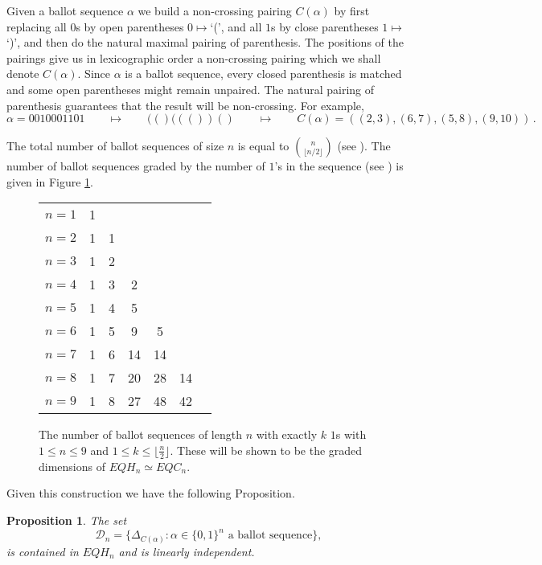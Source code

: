 \documentclass[11pt,oneside]{amsart}
\newtheorem{prop}[theorem]{Proposition}
\theoremstyle{definition}
\numberwithin{equation}{section}
\begin{document}
Given a ballot sequence $\alpha$ we build a non-crossing pairing $C(\alpha)$ by first replacing all $0$s
by open parentheses $0\mapsto$`(',
and all $1$s by close parentheses $1\mapsto$`)',
and then do the natural maximal pairing of parenthesis. The positions of the pairings
give us in lexicographic order a non-crossing pairing which we shall denote $C(\alpha)$.
Since $\alpha$ is a ballot sequence, every closed parenthesis is matched
and some open parentheses might remain unpaired.
The natural pairing of parenthesis guarantees that the result will be non-crossing. For example,
\[
\alpha=0010001101 \qquad\mapsto\qquad (()((())() \qquad\mapsto\qquad C(\alpha)=((2,3),(6,7),(5,8),(9,10)) \,.
\]

The total number of ballot sequences of size $n$ is equal to $\binom{n}{\lfloor{n/2}\rfloor}$
(see \cite[\href{https://oeis.org/A001405}{A001405}]{OEIS}).
The number of ballot sequences graded by the number of $1$'s in the sequence
(see \cite[\href{https://oeis.org/A008315}{A008315}]{OEIS})
is given in Figure \ref{table:ballotseq}.


\begin{figure}[h]
\begin{tabular}{c||cccccc}
$n=1$&1&&&&\\
$n=2$&1&1&&&\\
$n=3$&1&2&&&\\
$n=4$&1&3&2&&\\
$n=5$&1&4&5&&\\
$n=6$&1&5&9&5&\\
$n=7$&1&6&14&14&\\
$n=8$&1&7&20&28&14\\
$n=9$&1&8&27&48&42\\
\end{tabular}
\caption{The number of ballot sequences of length $n$ with exactly $k$ $1$s
with $1 \leq n \leq 9$ and $1 \leq k \leq \lfloor \frac{n}{2} \rfloor$.
These will be shown to be the graded dimensions of $EQH_n \simeq EQC_n$.}
\label{table:ballotseq}
\end{figure}

Given this construction we have the following Proposition.

\begin{prop}\label{prop:harmbasis}
The set
$${\mathcal D}_n =\big\{ \Delta_{C(\alpha)}:  \alpha \in \{0, 1\}^n \text{ a ballot sequence}\big\},
$$
is contained in $EQH_n$ and is linearly independent.
\end{prop}
\end{document}
